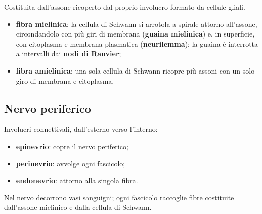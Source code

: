 Costituita dall'assone ricoperto dal proprio involucro formato da cellule gliali.
\begin{itemize}
  \item \textbf{fibra mielinica}: la cellula di Schwann si arrotola a spirale attorno all'assone, circondandolo con più giri di membrana (\textbf{guaina mielinica}) e, in superficie, con citoplasma e membrana plasmatica (\textbf{neurilemma}); la guaina è interrotta a intervalli dai \textbf{nodi di Ranvier};
  \item \textbf{fibra amielinica}: una sola cellula di Schwann ricopre più assoni con un solo giro di membrana e citoplasma.
\end{itemize}

\subsection{Nervo periferico}

Involucri connettivali, dall'esterno verso l'interno:
\begin{itemize}
  \item \textbf{epinevrio}: copre il nervo periferico;
  \item \textbf{perinevrio}: avvolge ogni fascicolo;
  \item \textbf{endonevrio}: attorno alla singola fibra.
\end{itemize}
Nel nervo decorrono vasi sanguigni; ogni fascicolo raccoglie fibre costituite dall'assone mielinico e dalla cellula di Schwann.
